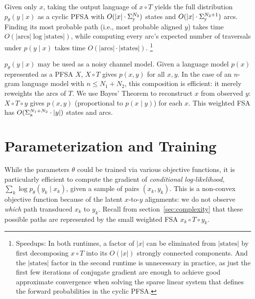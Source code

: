 \documentclass[11pt,letterpaper]{article}
\newcommand{\Sigmax}{\Sigma_{\text x}}
\newcommand{\Sigmay}{\Sigma_{\text y}}
\newcommand{\ptheta}{{p_\theta}}
\begin{document}
Given only $x$, taking the output language of $x \circ T$ yields the full distribution $\ptheta(y \mid x)$ as a cyclic PFSA with $O(|x|\cdot \Sigmay^{N_3})$ states and $O(|x|\cdot \Sigmay^{N_3+1})$ arcs.  Finding its most probable path (i.e., most probable aligned $y$) takes time $O(|\text{arcs}| \log |\text{states}|)$, while computing every arc's expected number of traversals under $p(y \mid x)$ takes time $O(|\text{arcs}| \cdot |\text{states}|)$.%
\footnote{Speedups: In both runtimes, a factor of $|x|$ can be eliminated from $|\text{states}|$ by first decomposing $x \circ T$ into its $O(|x|)$ strongly connected components.  And the $|\text{states}|$ factor in the second runtime is unnecessary in practice, as just the first few iterations of conjugate gradient are enough to achieve good approximate convergence when solving the sparse linear system that defines the forward probabilities in the cyclic PFSA.}

$\ptheta(y\mid x)$ may be used as a noisy channel model.  Given a language model $p(x)$ represented as a PFSA $X$, $X \circ T$ gives $p(x,y)$ for all $x,y$.  In the case of an $n$-gram language model with $n \leq N_1+N_2$, this composition is efficient: it merely reweights the arcs of $T$.  We use Bayes' Theorem to reconstruct $x$ from observed $y$: $X \circ T \circ y$ gives $p(x,y)$ (proportional to $p(x \mid y)$) for each $x$.  This weighted FSA has \linebreak $O(\Sigmax^{N_1+N_2} \cdot |y|)$ states and arcs.


\section{Parameterization and Training}\label{sec:parameterization}\label{sec:training}

While the parameters $\theta$ could be trained via various objective functions, it is particularly efficient to compute the gradient of {\em conditional log-likelihood}, 
$\sum_k \log \ptheta(y_k \mid x_k)$, given a sample of pairs $(x_k,y_k)$.  This is a non-convex objective function because of the latent $x$-to-$y$ alignments: we do not observe {\em which} path transduced $x_k$ to $y_k$.  Recall from section~\ref{sec:complexity} that these possible paths are represented by the small weighted FSA $x_k \circ T \circ y_k$.
\end{document}
